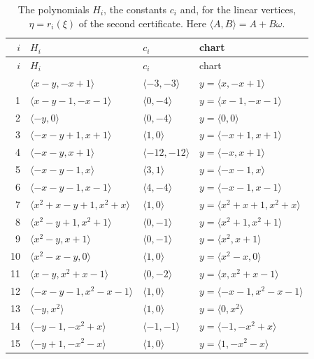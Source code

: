 \documentclass[11pt]{article}
\begin{document}
\begingroup\small
\setlength{\LTcapwidth}{\textwidth}
\begin{longtable}{@{}rlll@{}}
\caption{The polynomials $H_i$, the constants $c_i$ and, for the linear vertices, $\eta=r_i(\xi)$ of the second certificate. Here $\langle A,B\rangle=A+B\omega$.}\label{tab:vert2}\\
\hline $i$ & $H_i$ & $c_i$ & chart\\\hline\endfirsthead\hline $i$ & $H_i$ & $c_i$ & chart\\\hline\endhead\hline\endfoot
0 & $\langle x-y,-x+1\rangle$ & $\langle -3,-3\rangle$ & $y=\langle x,-x+1\rangle$\\
1 & $\langle x-y-1,-x-1\rangle$ & $\langle 0,-4\rangle$ & $y=\langle x-1,-x-1\rangle$\\
2 & $\langle -y,0\rangle$ & $\langle 0,-4\rangle$ & $y=\langle 0,0\rangle$\\
3 & $\langle -x-y+1,x+1\rangle$ & $\langle 1,0\rangle$ & $y=\langle -x+1,x+1\rangle$\\
4 & $\langle -x-y,x+1\rangle$ & $\langle -12,-12\rangle$ & $y=\langle -x,x+1\rangle$\\
5 & $\langle -x-y-1,x\rangle$ & $\langle 3,1\rangle$ & $y=\langle -x-1,x\rangle$\\
6 & $\langle -x-y-1,x-1\rangle$ & $\langle 4,-4\rangle$ & $y=\langle -x-1,x-1\rangle$\\
7 & $\langle x^{2}+x-y+1,x^{2}+x\rangle$ & $\langle 1,0\rangle$ & $y=\langle x^{2}+x+1,x^{2}+x\rangle$\\
8 & $\langle x^{2}-y+1,x^{2}+1\rangle$ & $\langle 0,-1\rangle$ & $y=\langle x^{2}+1,x^{2}+1\rangle$\\
9 & $\langle x^{2}-y,x+1\rangle$ & $\langle 0,-1\rangle$ & $y=\langle x^{2},x+1\rangle$\\
10 & $\langle x^{2}-x-y,0\rangle$ & $\langle 1,0\rangle$ & $y=\langle x^{2}-x,0\rangle$\\
11 & $\langle x-y,x^{2}+x-1\rangle$ & $\langle 0,-2\rangle$ & $y=\langle x,x^{2}+x-1\rangle$\\
12 & $\langle -x-y-1,x^{2}-x-1\rangle$ & $\langle 1,0\rangle$ & $y=\langle -x-1,x^{2}-x-1\rangle$\\
13 & $\langle -y,x^{2}\rangle$ & $\langle 1,0\rangle$ & $y=\langle 0,x^{2}\rangle$\\
14 & $\langle -y-1,-x^{2}+x\rangle$ & $\langle -1,-1\rangle$ & $y=\langle -1,-x^{2}+x\rangle$\\
15 & $\langle -y+1,-x^{2}-x\rangle$ & $\langle 1,0\rangle$ & $y=\langle 1,-x^{2}-x\rangle$\\

\end{longtable}
\end{document}
